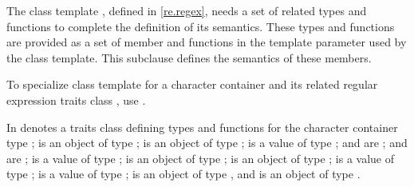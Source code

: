 \pnum
The class template , defined in
\ref{re.regex}, needs a set of related types and
functions to complete the definition of its semantics. These types
and functions are provided as a set of member  and functions
in the template parameter  used by the  class
template. This subclause defines the semantics of these
members.

\pnum
To specialize class template  for a character
container  and its related regular
expression traits class , use .

\pnum
{}%
%
%
%
In   denotes a traits class
defining types and functions for the character container
type ;  is an object of
type ;  is an object of type ;  is a value of type ; 
and  are ;
 and  are ;
 is a value of type ;
 is an object of type ;
 is an object of type ;
 is a value of  type ;
 is a value of type ;
 is an object of type ,
and  is an object of type .

